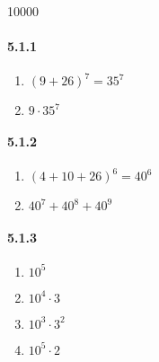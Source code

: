\documentclass[11pt, letterpaper, twocolumn, fleqn]{article}
\begin{document}
\renewcommand{\labelenumi}{\alph{enumi}.}
\renewcommand{\labelenumii}{(\arabic{enumii})}
\renewcommand{\qedsymbol}{$\blacksquare$}

 10000
\raggedbottom
\pagestyle{headings}

\paragraph{5.1.1}
\begin{enumerate}
  \item $(9 + 26)^7 = 35^7$
  \item $9 \cdot 35^7$
\end{enumerate}

\paragraph{5.1.2}
\begin{enumerate}
  \item $(4 + 10 + 26)^6 = 40^6$
  \item $40^7 + 40^8 + 40^9$
\end{enumerate}

\paragraph{5.1.3}
\begin{enumerate}
  \item $10^5$
  \item $10^4 \cdot 3$
  \item $10^3 \cdot 3^2$
  \item $10^5 \cdot 2$
\end{enumerate}
\end{document}
